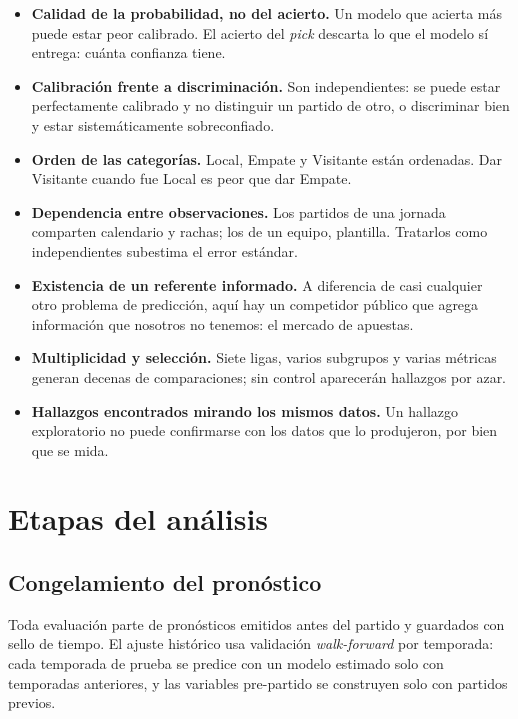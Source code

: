 \documentclass{pas}
\begin{document}
\begin{itemize}
\item \textbf{Calidad de la probabilidad, no del acierto.} Un modelo que acierta más puede estar peor calibrado.
El acierto del \emph{pick} descarta lo que el modelo sí entrega: cuánta confianza tiene.
\item \textbf{Calibración frente a discriminación.} Son independientes: se puede estar perfectamente calibrado y no
distinguir un partido de otro, o discriminar bien y estar sistemáticamente sobreconfiado.
\item \textbf{Orden de las categorías.} Local, Empate y Visitante están ordenadas. Dar Visitante cuando fue Local
es peor que dar Empate.
\item \textbf{Dependencia entre observaciones.} Los partidos de una jornada comparten calendario y rachas; los de
un equipo, plantilla. Tratarlos como independientes subestima el error estándar.
\item \textbf{Existencia de un referente informado.} A diferencia de casi cualquier otro problema de predicción,
aquí hay un competidor público que agrega información que nosotros no tenemos: el mercado de apuestas.
\item \textbf{Multiplicidad y selección.} Siete ligas, varios subgrupos y varias métricas generan decenas de
comparaciones; sin control aparecerán hallazgos por azar.
\item \textbf{Hallazgos encontrados mirando los mismos datos.} Un hallazgo exploratorio no puede confirmarse con
los datos que lo produjeron, por bien que se mida.
\end{itemize}

\section{Etapas del análisis}

\subsection{Congelamiento del pronóstico}
Toda evaluación parte de pronósticos emitidos antes del partido y guardados con sello de tiempo. El ajuste
histórico usa validación \emph{walk-forward} por temporada: cada temporada de prueba se predice con un modelo
estimado solo con temporadas anteriores, y las variables pre-partido se construyen solo con partidos previos.
\end{document}
